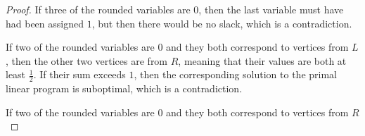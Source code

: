 \documentclass[letterpaper,11pt]{article}
\begin{document}
\begin{enumerate}
\begin{enumerate}
\begin{proof}
                    If three of the rounded variables are $0$, then the last
                    variable must have had been assigned $1$, but then there
                    would be no slack, which is a contradiction.

                    If two of the rounded variables are $0$ and they both
                    correspond to vertices from $L$, then the other two
                    vertices are from $R$, meaning that their values are both
                    at least $\frac{1}{2}$.
                    If their sum exceeds $1$, then the corresponding solution
                    to the primal linear program is suboptimal, which is a
                    contradiction.

                    If two of the rounded variables are $0$ and they both
                    correspond to vertices from $R$
                \end{proof}
        \end{enumerate}
\end{enumerate}
\end{document}
